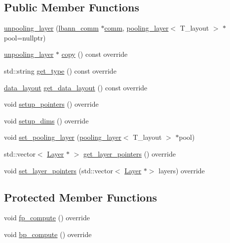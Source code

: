 \subsection*{Public Member Functions}
\begin{DoxyCompactItemize}
\item 
\hyperlink{classlbann_1_1unpooling__layer_a40055be5b45cb444581987395befc09a}{unpooling\+\_\+layer} (\hyperlink{classlbann_1_1lbann__comm}{lbann\+\_\+comm} $\ast$\hyperlink{file__io_8cpp_ab048c6f9fcbcfaa57ce68b00263dbebe}{comm}, \hyperlink{classlbann_1_1pooling__layer}{pooling\+\_\+layer}$<$ T\+\_\+layout $>$ $\ast$pool=nullptr)
\item 
\hyperlink{classlbann_1_1unpooling__layer}{unpooling\+\_\+layer} $\ast$ \hyperlink{classlbann_1_1unpooling__layer_ad8458ddba48f92e2b7b8e3bacd5c801e}{copy} () const override
\item 
std\+::string \hyperlink{classlbann_1_1unpooling__layer_a62d5cc8bb9c2c5fa7b4b82ee8de9d8e6}{get\+\_\+type} () const override
\item 
\hyperlink{base_8hpp_a786677cbfb3f5677b4d84f3056eb08db}{data\+\_\+layout} \hyperlink{classlbann_1_1unpooling__layer_a453a34396ba52482508668d1658bf727}{get\+\_\+data\+\_\+layout} () const override
\item 
void \hyperlink{classlbann_1_1unpooling__layer_a32da9e26ce50aa3df3ecc52691bd5e4f}{setup\+\_\+pointers} () override
\item 
void \hyperlink{classlbann_1_1unpooling__layer_a7fe47a0c90958329efb79aee49d6247f}{setup\+\_\+dims} () override
\item 
void \hyperlink{classlbann_1_1unpooling__layer_a5269d1939056430c0d8033629a770b38}{set\+\_\+pooling\+\_\+layer} (\hyperlink{classlbann_1_1pooling__layer}{pooling\+\_\+layer}$<$ T\+\_\+layout $>$ $\ast$pool)
\item 
std\+::vector$<$ \hyperlink{classlbann_1_1Layer}{Layer} $\ast$ $>$ \hyperlink{classlbann_1_1unpooling__layer_a33e17164da27e3370fb3f362dd2e6c13}{get\+\_\+layer\+\_\+pointers} () override
\item 
void \hyperlink{classlbann_1_1unpooling__layer_aacc3a2fdd75ecee8614a00a85697a763}{set\+\_\+layer\+\_\+pointers} (std\+::vector$<$ \hyperlink{classlbann_1_1Layer}{Layer} $\ast$$>$ layers) override
\end{DoxyCompactItemize}
\subsection*{Protected Member Functions}
\begin{DoxyCompactItemize}
\item 
void \hyperlink{classlbann_1_1unpooling__layer_aad98d442d6f5ad1feb5f1d71bdb1df49}{fp\+\_\+compute} () override
\item 
void \hyperlink{classlbann_1_1unpooling__layer_ad585e8ddaa34c221fa8e4d108c8950ae}{bp\+\_\+compute} () override
\end{DoxyCompactItemize}
